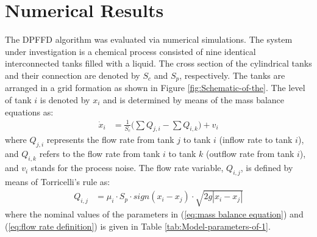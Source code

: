 \documentclass[10pt,twocolumn,twoside]{IEEEtran}
\begin{document}
\section{Numerical Results}\label{sec:Numerical-Results}

The DPFFD algorithm was evaluated via numerical simulations. The system
under investigation is a chemical process consisted of nine identical
interconnected tanks filled with a liquid. The cross section of the
cylindrical tanks and their connection are denoted by $S_{c}$ and
$S_{p}$, respectively. The tanks are arranged in a grid formation
as shown in Figure \ref{fig:Schematic-of-the}. The level of tank
$i$ is denoted by $x_{i}$ and is determined by means of the mass
balance equations as:
\begin{equation}
\begin{aligned}\dot{x}_{i} & =\frac{1}{S_{c}}\Big(\sum Q_{j,i}-\sum Q_{i,k}\Big)+v_{i}\end{aligned}
\label{eq:mass balance equation}
\end{equation}
where $Q_{j,i}$ represents the flow rate from tank $j$ to tank $i$
(inflow rate to tank $i$), and $Q_{i,k}$ refers to the flow rate
from tank $i$ to tank $k$ (outflow rate from tank $i$), and $v_{i}$
stands for the process noise. The flow rate variable, $Q_{i,j}$,
is defined by means of Torricelli's rule as: 
\begin{equation}
\begin{aligned}Q_{i,j} & =\mu_{i}\cdot S_{p}\cdot sign(x_{i}-x_{j})\cdot\sqrt{2g|x_{i}-x_{j}|}\end{aligned}
\label{eq:flow rate definition}
\end{equation}
where the nominal values of the parameters in (\ref{eq:mass balance equation})
and (\ref{eq:flow rate definition}) is given in Table \ref{tab:Model-parameters-of-1}. 
\end{document}
